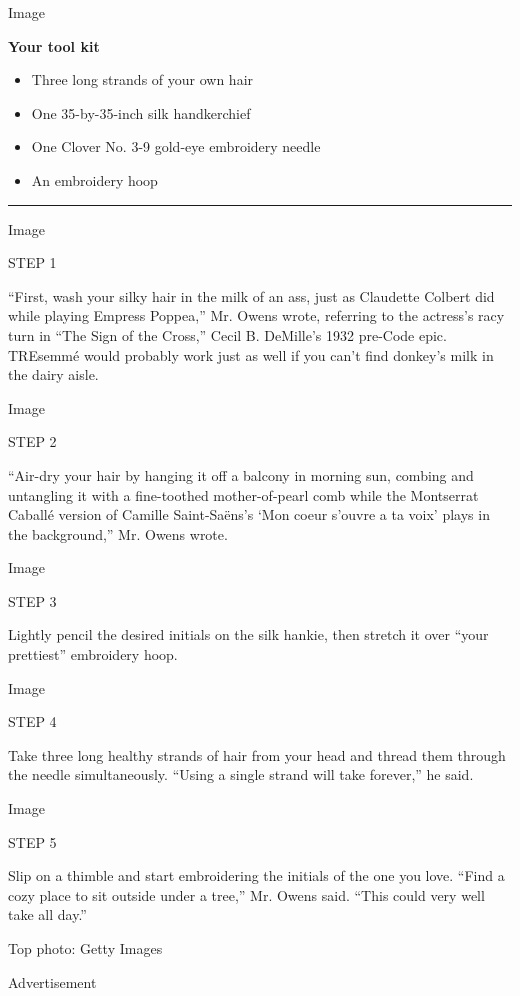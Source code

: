 Image

\textbf{Your tool kit}

\begin{itemize}
\item
  Three long strands of your own hair
\item
  One 35-by-35-inch silk handkerchief
\item
  One Clover No. 3-9 gold-eye embroidery needle
\item
  An embroidery hoop
\end{itemize}

\begin{center}\rule{0.5\linewidth}{\linethickness}\end{center}

Image

STEP 1

``First, wash your silky hair in the milk of an ass, just as Claudette
Colbert did while playing Empress Poppea,'' Mr. Owens wrote, referring
to the actress's racy turn in ``The Sign of the Cross,'' Cecil B.
DeMille's 1932 pre-Code epic. TREsemmé would probably work just as well
if you can't find donkey's milk in the dairy aisle.

Image

STEP 2

``Air-dry your hair by hanging it off a balcony in morning sun, combing
and untangling it with a fine-toothed mother-of-pearl comb while the
Montserrat Caballé version of Camille Saint-Saëns's `Mon coeur s'ouvre a
ta voix' plays in the background,'' Mr. Owens wrote.

Image

STEP 3

Lightly pencil the desired initials on the silk hankie, then stretch it
over ``your prettiest'' embroidery hoop.

Image

STEP 4

Take three long healthy strands of hair from your head and thread them
through the needle simultaneously. ``Using a single strand will take
forever,'' he said.

Image

STEP 5

Slip on a thimble and start embroidering the initials of the one you
love. ``Find a cozy place to sit outside under a tree,'' Mr. Owens said.
``This could very well take all day.''

Top photo: Getty Images

Advertisement

